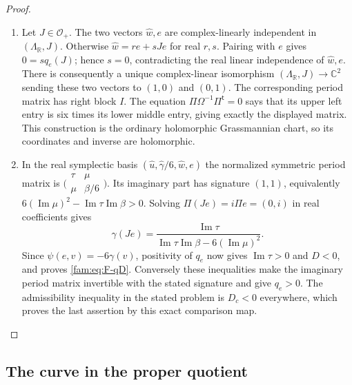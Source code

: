 \begin{proof}
\begin{enumerate}[label=\arabic*.,leftmargin=*]
\item Let $J\in\mathcal O_+$.  The two vectors $\widehat w,e$ are complex-linearly
independent in $(\Lambda_{\mathbb R},J)$.  Otherwise
$\widehat w=r e+sJe$ for real $r,s$.  Pairing with $e$ gives
$0=sq_e(J)$; hence $s=0$, contradicting the real linear independence
of $\widehat w,e$.  There is consequently a unique complex-linear
isomorphism $(\Lambda_{\mathbb R},J)\to\mathbb C^2$ sending these two
vectors to $(1,0)$ and $(0,1)$.  The corresponding period matrix has
right block $I$.  The equation
$\Pi\Omega^{-1}\Pi^{\mathsf t}=0$ says that its upper left entry is
six times its lower middle entry, giving exactly the displayed matrix.
This construction is the ordinary holomorphic Grassmannian chart,
so its coordinates and inverse are holomorphic.

\item In the real symplectic basis
$(\widehat u,\widehat\gamma/6,\widehat w,e)$ the normalized symmetric
period matrix is
$\bigl(\begin{smallmatrix}\tau&\mu\\\mu&\beta/6\end{smallmatrix}\bigr)$.
Its imaginary part has signature $(1,1)$, equivalently
$6(\operatorname{Im}\mu)^2-
\operatorname{Im}\tau\operatorname{Im}\beta>0$.
Solving $\Pi(Je)=i\Pi e=(0,i)$ in real coefficients gives
\[
 \gamma(Je)=
 \frac{\operatorname{Im}\tau}
 {\operatorname{Im}\tau\operatorname{Im}\beta-
 6(\operatorname{Im}\mu)^2}.
\]
Since $\psi(e,v)=-6\gamma(v)$, positivity of $q_e$ now gives
$\operatorname{Im}\tau>0$ and $D<0$, and proves \eqref{fam:eq:F-qD}.
Conversely these inequalities make the imaginary period matrix
invertible with the stated signature and give $q_e>0$.  The admissibility
inequality in the stated problem is $D_c<0$ everywhere, which proves the last
assertion by this exact comparison map.
\end{enumerate}
\end{proof}

\subsection{The curve in the proper quotient}\label{fam:section:F.3}

